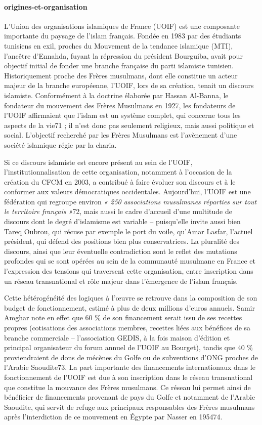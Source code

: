 \paragraph{origines-et-organisation}

L'Union des organisations islamiques de France (UOIF) est une composante
importante du paysage de l'islam français. Fondée en 1983 par des
étudiants tunisiens en exil, proches du Mouvement de la tendance
islamique (MTI), l'ancêtre d'Ennahda, fuyant la répression du président
Bourguiba, avait pour objectif initial de fonder une branche française
du parti islamiste tunisien. Historiquement proche des Frères musulmans,
dont elle constitue un acteur majeur de la branche européenne, l'UOIF,
lors de sa création, tenait un discours islamiste. Conformément à la
doctrine élaborée par Hassan Al-Banna, le fondateur du mouvement des
Frères Musulmans en 1927, les fondateurs de l'UOIF affirmaient que
l'islam est un système complet, qui concerne tous les aspects de la
vie71 ; il n'est donc pas seulement religieux, mais aussi politique et
social. L'objectif recherché par les Frères Musulmans est l'avènement
d'une société islamique régie par la charia.

Si ce discours islamiste est encore présent au sein de l'UOIF,
l'institutionnalisation de cette organisation, notamment à l'occasion de
la création du CFCM en 2003, a contribué à faire évoluer son discours et
à le conformer aux valeurs démocratiques occidentales. Aujourd'hui,
l'UOIF est une fédération qui regroupe environ \emph{« 250 associations
musulmanes réparties sur tout le territoire français »}72, mais aussi le
cadre d'accueil d'une multitude de discours dont le degré d'islamisme
est variable -- puisqu'elle invite aussi bien Tareq Oubrou, qui récuse
par exemple le port du voile, qu'Amar Lasfar, l'actuel président, qui
défend des positions bien plus conservatrices. La pluralité des
discours, ainsi que leur éventuelle contradiction sont le reflet des
mutations profondes
qui se sont opérées au sein de la communauté musulmane en France et
l'expression des tensions qui traversent cette organisation, entre
inscription dans un réseau transnational et rôle majeur dans l'émergence
de l'islam français.

Cette hétérogénéité des logiques à l'œuvre se retrouve dans la
composition de son budget de fonctionnement, estimé à plus de deux
millions d'euros annuels. Samir Amghar note en effet que 60 \% de son
financement serait issu de ses recettes propres (cotisations des
associations membres, recettes liées aux bénéfices de sa branche
commerciale -- l'association GEDIS, à la fois maison d'édition et
principal organisateur du forum annuel de l'UOIF au Bourget), tandis que
40 \% proviendraient de dons de mécènes du Golfe ou de subventions d'ONG
proches de l'Arabie Saoudite73. La part importante des financements
internationaux dans le fonctionnement de l'UOIF est due à son
inscription dans le réseau transnational que constitue la mouvance des
Frères musulmans. Ce réseau lui permet ainsi de bénéficier de
financements provenant de pays du Golfe et notamment de l'Arabie
Saoudite, qui servit de refuge aux principaux responsables des Frères
musulmans après l'interdiction de ce mouvement en Égypte par Nasser en
195474.

